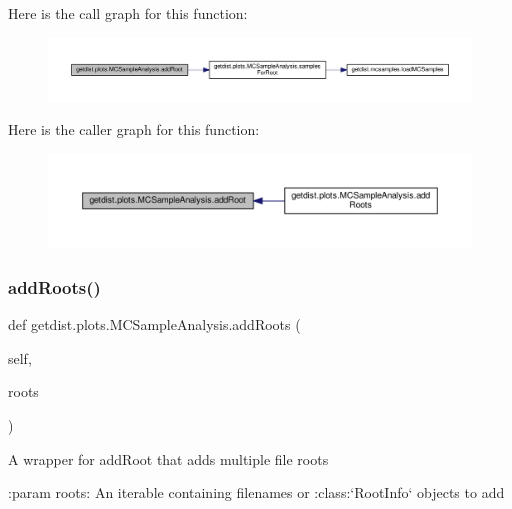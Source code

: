 Here is the call graph for this function\+:
\nopagebreak
\begin{figure}[H]
\begin{center}
\leavevmode
\includegraphics[width=350pt]{classgetdist_1_1plots_1_1MCSampleAnalysis_a66016ce12ceb418f0bdf2717f272e57a_cgraph}
\end{center}
\end{figure}
Here is the caller graph for this function\+:
\nopagebreak
\begin{figure}[H]
\begin{center}
\leavevmode
\includegraphics[width=350pt]{classgetdist_1_1plots_1_1MCSampleAnalysis_a66016ce12ceb418f0bdf2717f272e57a_icgraph}
\end{center}
\end{figure}
\mbox{\label{classgetdist_1_1plots_1_1MCSampleAnalysis_adfcdd2464aa89d7c72dbf8f4bf0a04ae}} 
\subsubsection{\texorpdfstring{add\+Roots()}{addRoots()}}
{\footnotesize\ttfamily def getdist.\+plots.\+M\+C\+Sample\+Analysis.\+add\+Roots (\begin{DoxyParamCaption}\item[{}]{self,  }\item[{}]{roots }\end{DoxyParamCaption})}

\begin{DoxyVerb}A wrapper for addRoot that adds multiple file roots

:param roots: An iterable containing filenames or :class:`RootInfo` objects to add
\end{DoxyVerb}
 

